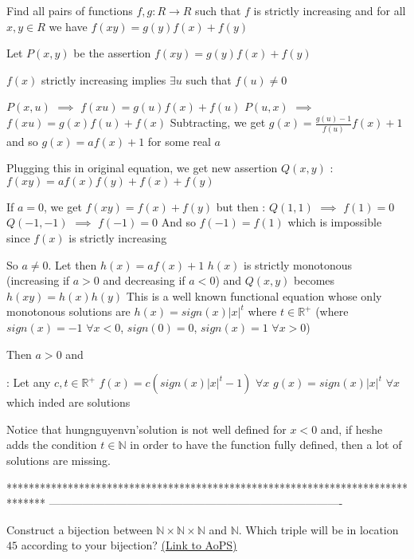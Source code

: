 \begin{solution}
	\begin{tcolorbox}Find all pairs of functions $f,g: R \rightarrow R$ such that $f$ is strictly increasing and for all $x,y \in R$ we have $f(xy)=g(y)f(x)+f(y)$\end{tcolorbox}
Let $P(x,y)$ be the assertion $f(xy)=g(y)f(x)+f(y)$

$f(x)$ strictly increasing implies $\exists u$ such that $f(u)\ne 0$

$P(x,u)$ $\implies$ $f(xu)=g(u)f(x)+f(u)$
$P(u,x)$ $\implies$ $f(xu)=g(x)f(u)+f(x)$
Subtracting, we get $g(x)=\frac{g(u)-1}{f(u)}f(x)+1$ and so $g(x)=af(x)+1$ for some real $a$

Plugging this in original equation, we get new assertion $Q(x,y)$ : $f(xy)=af(x)f(y)+f(x)+f(y)$

If $a=0$, we get $f(xy)=f(x)+f(y)$ but then :
$Q(1,1)$ $\implies$ $f(1)=0$
$Q(-1,-1)$ $\implies$ $f(-1)=0$
And so $f(-1)=f(1)$ which is impossible since $f(x)$ is strictly increasing

So $a\ne 0$. Let then $h(x)=af(x)+1$
$h(x)$ is strictly monotonous (increasing if $a>0$ and decreasing if $a<0$) and $Q(x,y)$ becomes $h(xy)=h(x)h(y)$
This is a well known functional equation whose only monotonous solutions are $h(x)=sign(x)|x|^t$ where $t\in\mathbb R^+$
(where $sign(x)=-1$ $\forall x<0$, $sign(0)=0$, $sign(x)=1$ $\forall x>0$)

Then $a>0$ and : 
Let any $c,t\in\mathbb R^+$
$f(x)=c(sign(x)|x|^t-1)$ $\forall x$
$g(x)=sign(x)|x|^t$ $\forall x$
which inded are solutions

Notice that hungnguyenvn'solution is not well defined for $x<0$ and, if he\/she adds the condition $t\in\mathbb N$ in order to have the function fully defined, then a lot of solutions are missing.
\end{solution}
*******************************************************************************
-------------------------------------------------------------------------------

\begin{problem}
	Construct a bijection between $\mathbb N \times \mathbb  N \times \mathbb N$ and $\mathbb N$.
Which triple will be in location $45$ according to your bijection?
	\flushright \href{https://artofproblemsolving.com/community/c6h438891}{(Link to AoPS)}
\end{problem}



